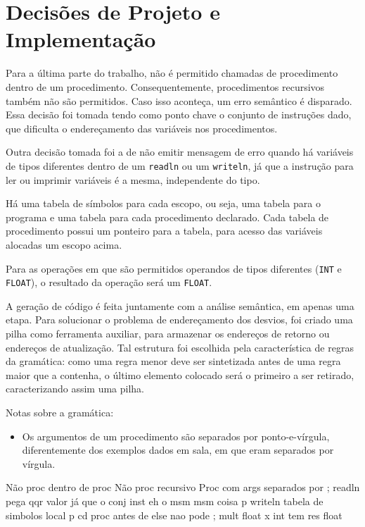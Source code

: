 \section{Decisões de Projeto e Implementação}

Para a última parte do trabalho, não é permitido chamadas de
procedimento dentro de um procedimento. Consequentemente, procedimentos
recursivos também não são permitidos. Caso isso aconteça, um erro semântico é
disparado. Essa decisão foi tomada tendo como ponto chave o conjunto de
instruções dado, que dificulta o endereçamento das variáveis nos procedimentos.

Outra decisão tomada foi a de não emitir mensagem de erro quando há variáveis
de tipos diferentes dentro de um \texttt{readln} ou um \texttt{writeln}, já que
a instrução para ler ou imprimir variáveis é a mesma, independente do tipo.

Há uma tabela de símbolos para cada escopo, ou seja, uma tabela para o programa
e uma tabela para cada procedimento declarado. Cada tabela de procedimento
possui um ponteiro para a tabela, para acesso das variáveis alocadas um escopo
acima.

Para as operações em que são permitidos operandos de tipos diferentes 
(\texttt{INT} e \texttt{FLOAT}), o resultado da operação será um \texttt{FLOAT}.

A geração de código é feita juntamente com a análise semântica, em apenas uma
etapa. Para solucionar o problema de endereçamento dos desvios, foi criado uma
pilha como ferramenta auxiliar, para armazenar os endereços de retorno ou
endereços de atualização. Tal estrutura foi escolhida pela característica de
regras da gramática: como uma regra menor deve ser sintetizada antes de uma
regra maior que a contenha, o último elemento colocado será o primeiro a ser
retirado, caracterizando assim uma pilha.

Notas sobre a gramática:
\begin{itemize}
	\item Os argumentos de um procedimento são separados por ponto-e-vírgula,
	diferentemente dos exemplos dados em sala, em que eram separados por
	vírgula.
\end{itemize}

Não proc dentro de proc
Não proc recursivo
Proc com args separados por ;
readln pega qqr valor já que o conj inst eh o msm
msm coisa p writeln
tabela de simbolos local p cd proc
antes de else nao pode ;
mult float x int tem res float

